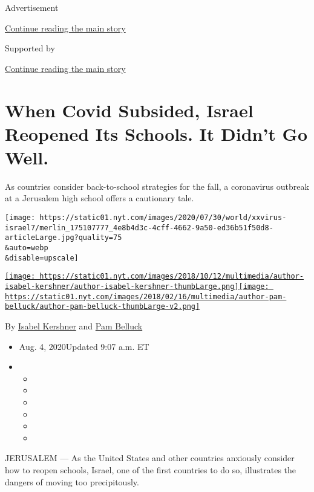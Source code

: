 Advertisement

\protect\hyperlink{after-top}{Continue reading the main story}

Supported by

\protect\hyperlink{after-sponsor}{Continue reading the main story}

\hypertarget{when-covid-subsided-israel-reopened-its-schools-it-didnt-go-well}{%
\section{When Covid Subsided, Israel Reopened Its Schools. It Didn't Go
Well.}\label{when-covid-subsided-israel-reopened-its-schools-it-didnt-go-well}}

As countries consider back-to-school strategies for the fall, a
coronavirus outbreak at a Jerusalem high school offers a cautionary
tale.

\texttt{[image: https://static01.nyt.com/images/2020/07/30/world/xxvirus-israel7/merlin\_175107777\_4e8b4d3c-4cff-4662-9a50-ed36b51f50d8-articleLarge.jpg?quality=75\\\&auto=webp\\\&disable=upscale]}

\href{https://www.nytimes.com/by/isabel-kershner}{\texttt{[image: https://static01.nyt.com/images/2018/10/12/multimedia/author-isabel-kershner/author-isabel-kershner-thumbLarge.png]}}\href{https://www.nytimes.com/by/pam-belluck}{\texttt{[image: https://static01.nyt.com/images/2018/02/16/multimedia/author-pam-belluck/author-pam-belluck-thumbLarge-v2.png]}}

By \href{https://www.nytimes.com/by/isabel-kershner}{Isabel Kershner}
and \href{https://www.nytimes.com/by/pam-belluck}{Pam Belluck}

\begin{itemize}
\item
  Aug. 4, 2020Updated 9:07 a.m. ET
\item
  \begin{itemize}
  \item
  \item
  \item
  \item
  \item
  \item
  \end{itemize}
\end{itemize}

JERUSALEM --- As the United States and other countries anxiously
consider how to reopen schools, Israel, one of the first countries to do
so, illustrates the dangers of moving too precipitously.

